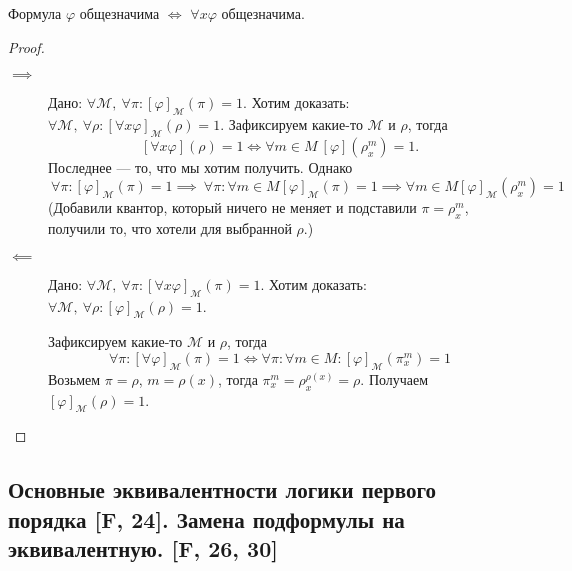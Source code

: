 \documentclass[a4paper, fleqn]{article}
\begin{document}
    \begin{lemma}
        Формула $\varphi$ общезначима $\iff$ $\forall x \varphi$ общезначима.
    \end{lemma}
    
    \begin{proof}~
        \begin{description}
            \item[$\implies$] Дано: $\forall \mathcal{M},~\forall \pi \colon [\varphi]_{\mathcal{M}}(\pi) = 1$.
            Хотим доказать: $\forall \mathcal{M},~\forall \rho \colon [\forall x \varphi]_{\mathcal{M}}(\rho) = 1$.
            Зафиксируем какие-то $\mathcal{M}$ и $\rho$, тогда
            \[
                [\forall x \varphi](\rho) = 1 \iff \forall m \in M~ [\varphi]\left(\rho_{x}^{m}\right) = 1.
            \]
            Последнее --- то, что мы хотим получить. Однако 
            \[
                ~\forall \pi \colon [\varphi]_{\mathcal{M}}(\pi) = 1 \implies
                ~\forall \pi \colon \forall m \in M [\varphi]_{\mathcal{M}}(\pi) = 1 \implies
                \forall m \in M [\varphi]_{\mathcal{M}}(\rho_{x}^{m}) = 1
            \]
            (Добавили квантор, который ничего не меняет и подставили $\pi = \rho_{x}^{m}$, получили
            то, что хотели для выбранной $\rho$.)
            
            \item[$\impliedby$] Дано: $\forall \mathcal{M},~\forall \pi \colon [\forall x \varphi]_{\mathcal{M}}(\pi) = 1$.
            Хотим доказать: $\forall \mathcal{M},~\forall \rho \colon [\varphi]_{\mathcal{M}}(\rho) = 1$.

            Зафиксируем какие-то $\mathcal{M}$ и $\rho$, тогда
            \[
                \forall \pi \colon [\forall\varphi]_{\mathcal{M}}(\pi) = 1 \iff
                \forall \pi \colon \forall m \in M \colon [\varphi]_{\mathcal{M}}\left(\pi_{x}^{m}\right) = 1
            \]
            Возьмем $\pi = \rho$, $m = \rho(x)$, тогда $\pi_{x}^{m} = \rho_{x}^{\rho(x)} = \rho$. 
            Получаем $[\varphi]_{\mathcal{M}}(\rho) = 1$.
        \end{description}
    \end{proof}

    \subsection{Основные эквивалентности логики первого порядка [F, 24]. Замена подформулы на эквивалентную. [F, 26, 30]}
\end{document}
